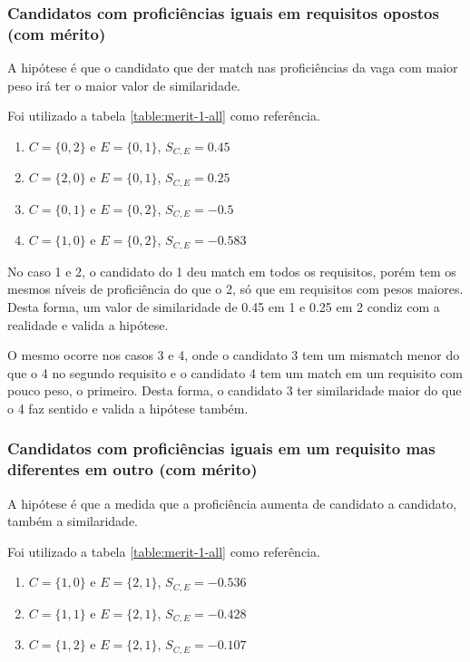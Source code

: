 \documentclass[preprint,12pt]{elsarticle}
\begin{document}
\subsubsection{Candidatos com proficiências iguais em requisitos opostos (com mérito)}

A hipótese é que o candidato que der match nas proficiências da vaga com maior peso irá ter o maior valor de similaridade.

Foi utilizado a tabela \ref{table:merit-1-all} como referência.

\begin{enumerate}
    \item $C = \{0,2\}$ e $E = \{0,1\}$, $S_{C,E} = 0.45$
    \item $C = \{2,0\}$ e $E = \{0,1\}$, $S_{C,E} = 0.25$
    \item $C = \{0,1\}$ e $E = \{0,2\}$, $S_{C,E} = -0.5$
    \item $C = \{1,0\}$ e $E = \{0,2\}$, $S_{C,E} = -0.583$
\end{enumerate}

No caso 1 e 2, o candidato do 1 deu match em todos os requisitos, porém tem os mesmos níveis de proficiência do que o 2, só que em requisitos com pesos maiores. Desta forma, um valor de similaridade de 0.45 em 1 e 0.25 em 2 condiz com a realidade e valida a hipótese.

O mesmo ocorre nos casos 3 e 4, onde o candidato 3 tem um mismatch menor do que o 4 no segundo requisito e o candidato 4 tem um match em um requisito com pouco peso, o primeiro. Desta forma, o candidato 3 ter similaridade maior do que o 4 faz sentido e valida a hipótese também.

\subsubsection{Candidatos com proficiências iguais em um requisito mas diferentes em outro (com mérito)}

A hipótese é que a medida que a proficiência aumenta de candidato a candidato, também a similaridade.

Foi utilizado a tabela \ref{table:merit-1-all} como referência.

\begin{enumerate}
    \item $C = \{1,0\}$ e $E = \{2,1\}$, $S_{C,E} = -0.536$
    \item $C = \{1,1\}$ e $E = \{2,1\}$, $S_{C,E} = -0.428$
    \item $C = \{1,2\}$ e $E = \{2,1\}$, $S_{C,E} = -0.107$
\end{enumerate}
\end{document}
